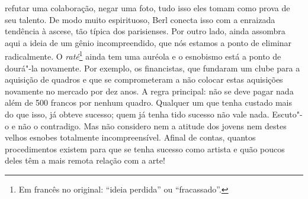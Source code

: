 refutar uma colaboração, negar uma foto, tudo isso eles tomam como prova
de seu talento. De modo muito espirituoso, Berl conecta isso com a
enraizada tendência à ascese, tão típica dos parisienses. Por outro lado,
ainda assombra aqui a ideia de um gênio incompreendido, que nós estamos a ponto de eliminar
radicalmente. O \emph{raté}\footnote{Em francês no original:
  ``ideia perdida'' ou ``fracassado''. \versal{[N. T.]}} ainda tem
uma auréola e o esnobismo está a ponto de dourá"-la novamente. Por
exemplo, os financistas, que fundaram um clube para a aquisição de
quadros e que se comprometeram a não colocar estas aquisições novamente
no mercado por dez anos. A regra principal: não se deve pagar nada além
de 500 francos por nenhum quadro. Qualquer um que tenha custado mais do
que isso, já obteve sucesso; quem já tenha tido sucesso não vale nada.
Escuto"-o e não o contradigo. Mas não considero nem a atitude dos jovens
nem destes velhos esnobes totalmente incompreensível. Afinal de contas,
quantos procedimentos existem para que se tenha sucesso como artista e
quão poucos deles têm a mais remota relação com a arte!

